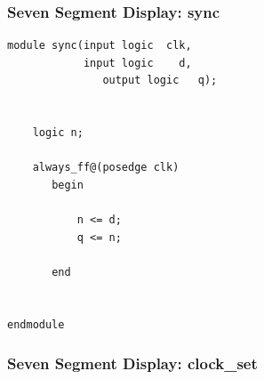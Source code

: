 \documentclass[a4paper]{article}
\begin{document}
\subsubsection{Seven Segment Display: sync}
\begin{Verbatim}
module sync(input logic  clk,
            input logic    d,
			   output logic   q);


	logic n;
	
	always_ff@(posedge clk) 
	   begin
	   
		   n <= d;
		   q <= n;
		
	   end
	   

endmodule 
\end{Verbatim}

\subsubsection{Seven Segment Display: clock_set}
\end{document}
